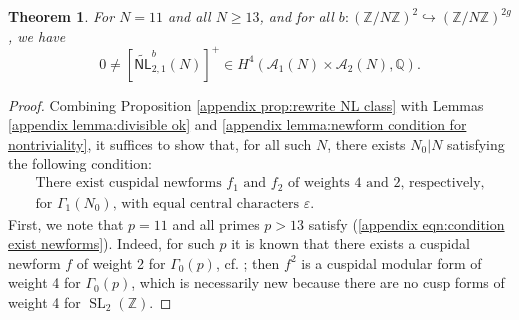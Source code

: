 \documentclass[12pt]{amsart}
\DeclareMathOperator{\SL}{SL}
\newtheorem{thm}{Theorem}[section]
\theoremstyle{definition}
\newcommand{\Z}{\mathbb{Z}}
\newcommand{\Q}{\mathbb{Q}}
\begin{document}
\begin{thm}\label{main appendix theorem}
    For $N = 11$ and all $N \geq 13$, and for all $b: (\Z/N\Z)^2 \hookrightarrow (\Z/N\Z)^{2g}$, we have $$0 \neq [\widetilde{\mathsf{NL}}_{2,1}^b(N)]^+\in H^4(\mathcal A_1(N)\times \mathcal A_2(N), \Q).$$
\end{thm}
\begin{proof}

Combining Proposition \ref{appendix prop:rewrite NL class} with Lemmas \ref{appendix lemma:divisible ok} and  \ref{appendix lemma:newform condition for nontriviality}, it suffices to show that, for all such $N$, there  exists $N_0|N$ satisfying the following condition:
\begin{equation}\label{appendix eqn:condition exist newforms}
    \tag{$\ast$}\begin{split}\textrm{There exist cuspidal newforms $f_1$ and $f_2$ of weights 4 and 2, respectively,} \\ \textrm{for  $\Gamma_1(N_0)$, with equal central characters $\varepsilon$.}\end{split}
\end{equation}
First, we note that $p = 11$ and all primes $p > 13$ satisfy (\ref{appendix eqn:condition exist newforms}). Indeed, for such $p$ it is known that there exists a cuspidal newform $f$ of weight 2 for $\Gamma_0(p)$, cf. \cite[Proposition B.3]{halberstadt2002courbes}; then $f^2$ is a cuspidal modular form of weight 4 for $\Gamma_0(p)$, which is necessarily new because there are no cusp forms of weight 4 for $\SL_2(\Z)$. 


\end{proof}
\end{document}
